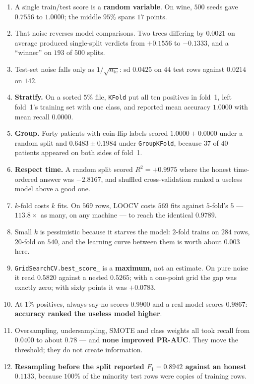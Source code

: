 \documentclass[11pt]{article}
\begin{document}
\begin{enumerate}[leftmargin=*]
  \item A single train/test score is a \textbf{random variable}. On wine, $500$
    seeds gave $0.7556$ to $1.0000$; the middle $95\%$ spans $17$ points.
  \item That noise reverses model comparisons. Two trees differing by $0.0021$
    on average produced single-split verdicts from $+0.1556$ to $-0.1333$, and
    a ``winner'' on $193$ of $500$ splits.
  \item Test-set noise falls only as $1/\sqrt{n_{\text{te}}}$: sd $0.0425$ on
    $44$ test rows against $0.0214$ on $142$.
  \item \textbf{Stratify.} On a sorted $5\%$ file, \texttt{KFold} put all ten
    positives in fold~1, left fold~1's training set with one class, and
    reported mean accuracy $1.0000$ with mean recall $0.0000$.
  \item \textbf{Group.} Forty patients with coin-flip labels scored
    $1.0000 \pm 0.0000$ under a random split and $0.6483 \pm 0.1984$ under
    \texttt{GroupKFold}, because $37$ of $40$ patients appeared on both sides
    of fold~1.
  \item \textbf{Respect time.} A random split scored $R^2 = +0.9975$ where the
    honest time-ordered answer was $-2.8167$, and shuffled cross-validation
    ranked a useless model above a good one.
  \item $k$-fold costs $k$ fits. On $569$ rows, LOOCV costs $569$ fits
    against $5$-fold's $5$ --- $113.8\times$ as many, on any machine --- to
    reach the identical $0.9789$.
  \item Small $k$ is pessimistic because it starves the model: $2$-fold trains
    on $284$ rows, $20$-fold on $540$, and the learning curve between them is
    worth about $0.003$ here.
  \item \texttt{GridSearchCV.best\_score\_} is a \textbf{maximum}, not an
    estimate. On pure noise it read $0.5820$ against a nested $0.5265$; with a
    one-point grid the gap was exactly zero; with sixty points it was
    $+0.0783$.
  \item At $1\%$ positives, always-say-no scores $0.9900$ and a real model
    scores $0.9867$: \textbf{accuracy ranked the useless model higher}.
  \item Oversampling, undersampling, SMOTE and class weights all took recall
    from $0.0400$ to about $0.78$ --- and \textbf{none improved PR-AUC}. They
    move the threshold; they do not create information.
  \item \textbf{Resampling before the split reported $F_1 = 0.8942$ against an
    honest $0.1133$}, because $100\%$ of the minority test rows were copies of
    training rows.
\end{enumerate}
\end{document}
